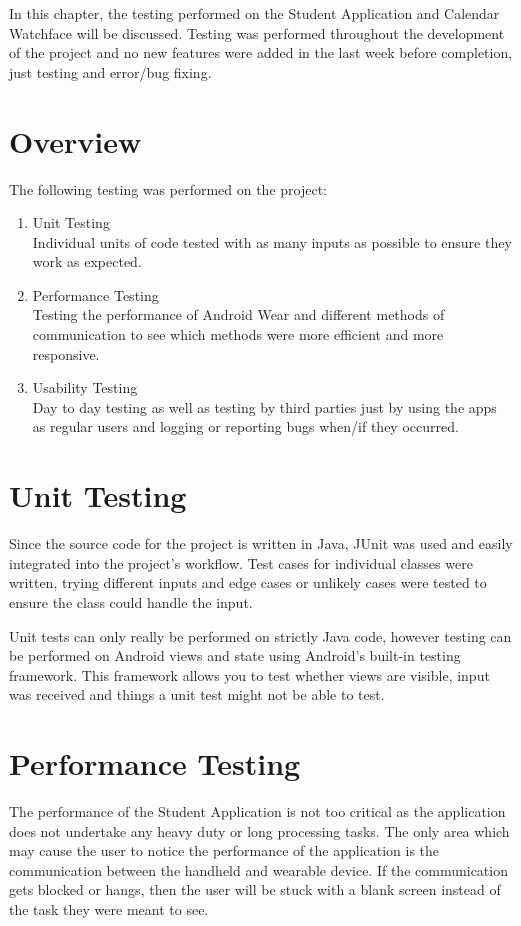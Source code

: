 In this chapter, the testing performed on the Student Application and Calendar
Watchface will be discussed. Testing was performed throughout the development
of the project and no new features were added in the last week before
completion, just testing and error/bug fixing.

\section{Overview}

The following testing was performed on the project:
\begin{enumerate}
\item Unit Testing\\
    Individual units of code tested with as many inputs as possible to ensure
    they work as expected.
\item Performance Testing\\
    Testing the performance of Android Wear and different methods of
    communication to see which methods were more efficient and more responsive.
\item Usability Testing\\
    Day to day testing as well as testing by third parties just by using the
    apps as regular users and logging or reporting bugs when/if they occurred.
\end{enumerate}

\section{Unit Testing}

Since the source code for the project is written in Java, JUnit was used and
easily integrated into the project's workflow. Test cases for individual classes
were written, trying different inputs and edge cases or unlikely cases were
tested to ensure the class could handle the input.

Unit tests can only really be performed on strictly Java code, however testing
can be performed on Android views and state using Android's built-in testing
framework. This framework allows you to test whether views are visible, input
was received and things a unit test might not be able to test.

\section{Performance Testing}
The performance of the Student Application is not too critical as the
application does not undertake any heavy duty or long processing tasks. The only
area which may cause the user to notice the performance of the application is
the communication between the handheld and wearable device. If the communication
gets blocked or hangs, then the user will be stuck with a blank screen instead
of the task they were meant to see.

